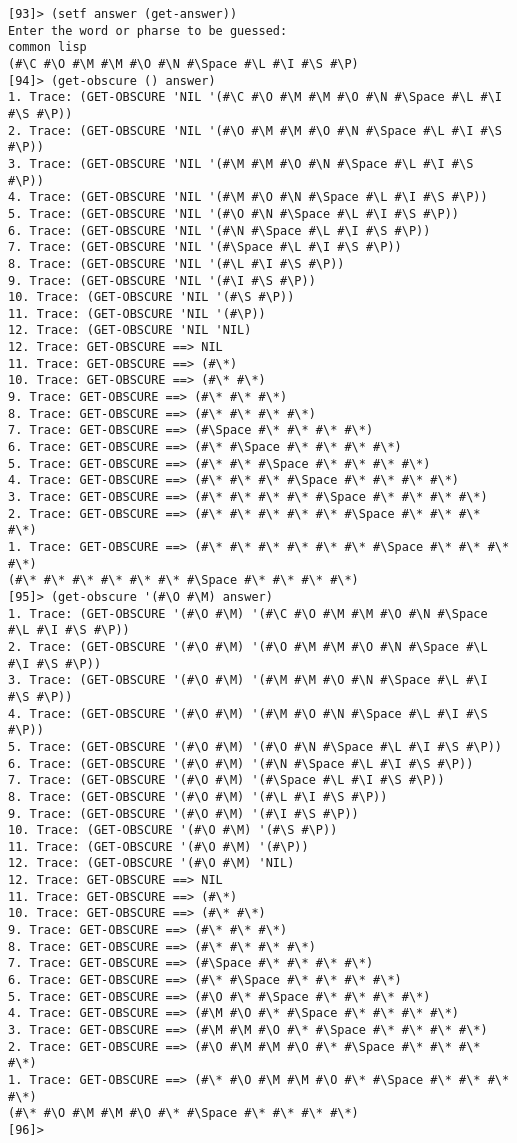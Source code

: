 \documentclass{article}
\begin{document}
\begin{verbatim}
[93]> (setf answer (get-answer))
Enter the word or pharse to be guessed:
common lisp
(#\C #\O #\M #\M #\O #\N #\Space #\L #\I #\S #\P)
[94]> (get-obscure () answer)
1. Trace: (GET-OBSCURE 'NIL '(#\C #\O #\M #\M #\O #\N #\Space #\L #\I #\S #\P))
2. Trace: (GET-OBSCURE 'NIL '(#\O #\M #\M #\O #\N #\Space #\L #\I #\S #\P))
3. Trace: (GET-OBSCURE 'NIL '(#\M #\M #\O #\N #\Space #\L #\I #\S #\P))
4. Trace: (GET-OBSCURE 'NIL '(#\M #\O #\N #\Space #\L #\I #\S #\P))
5. Trace: (GET-OBSCURE 'NIL '(#\O #\N #\Space #\L #\I #\S #\P))
6. Trace: (GET-OBSCURE 'NIL '(#\N #\Space #\L #\I #\S #\P))
7. Trace: (GET-OBSCURE 'NIL '(#\Space #\L #\I #\S #\P))
8. Trace: (GET-OBSCURE 'NIL '(#\L #\I #\S #\P))
9. Trace: (GET-OBSCURE 'NIL '(#\I #\S #\P))
10. Trace: (GET-OBSCURE 'NIL '(#\S #\P))
11. Trace: (GET-OBSCURE 'NIL '(#\P))
12. Trace: (GET-OBSCURE 'NIL 'NIL)
12. Trace: GET-OBSCURE ==> NIL
11. Trace: GET-OBSCURE ==> (#\*)
10. Trace: GET-OBSCURE ==> (#\* #\*)
9. Trace: GET-OBSCURE ==> (#\* #\* #\*)
8. Trace: GET-OBSCURE ==> (#\* #\* #\* #\*)
7. Trace: GET-OBSCURE ==> (#\Space #\* #\* #\* #\*)
6. Trace: GET-OBSCURE ==> (#\* #\Space #\* #\* #\* #\*)
5. Trace: GET-OBSCURE ==> (#\* #\* #\Space #\* #\* #\* #\*)
4. Trace: GET-OBSCURE ==> (#\* #\* #\* #\Space #\* #\* #\* #\*)
3. Trace: GET-OBSCURE ==> (#\* #\* #\* #\* #\Space #\* #\* #\* #\*)
2. Trace: GET-OBSCURE ==> (#\* #\* #\* #\* #\* #\Space #\* #\* #\* #\*)
1. Trace: GET-OBSCURE ==> (#\* #\* #\* #\* #\* #\* #\Space #\* #\* #\* #\*)
(#\* #\* #\* #\* #\* #\* #\Space #\* #\* #\* #\*)
[95]> (get-obscure '(#\O #\M) answer)
1. Trace: (GET-OBSCURE '(#\O #\M) '(#\C #\O #\M #\M #\O #\N #\Space #\L #\I #\S #\P))
2. Trace: (GET-OBSCURE '(#\O #\M) '(#\O #\M #\M #\O #\N #\Space #\L #\I #\S #\P))
3. Trace: (GET-OBSCURE '(#\O #\M) '(#\M #\M #\O #\N #\Space #\L #\I #\S #\P))
4. Trace: (GET-OBSCURE '(#\O #\M) '(#\M #\O #\N #\Space #\L #\I #\S #\P))
5. Trace: (GET-OBSCURE '(#\O #\M) '(#\O #\N #\Space #\L #\I #\S #\P))
6. Trace: (GET-OBSCURE '(#\O #\M) '(#\N #\Space #\L #\I #\S #\P))
7. Trace: (GET-OBSCURE '(#\O #\M) '(#\Space #\L #\I #\S #\P))
8. Trace: (GET-OBSCURE '(#\O #\M) '(#\L #\I #\S #\P))
9. Trace: (GET-OBSCURE '(#\O #\M) '(#\I #\S #\P))
10. Trace: (GET-OBSCURE '(#\O #\M) '(#\S #\P))
11. Trace: (GET-OBSCURE '(#\O #\M) '(#\P))
12. Trace: (GET-OBSCURE '(#\O #\M) 'NIL)
12. Trace: GET-OBSCURE ==> NIL
11. Trace: GET-OBSCURE ==> (#\*)
10. Trace: GET-OBSCURE ==> (#\* #\*)
9. Trace: GET-OBSCURE ==> (#\* #\* #\*)
8. Trace: GET-OBSCURE ==> (#\* #\* #\* #\*)
7. Trace: GET-OBSCURE ==> (#\Space #\* #\* #\* #\*)
6. Trace: GET-OBSCURE ==> (#\* #\Space #\* #\* #\* #\*)
5. Trace: GET-OBSCURE ==> (#\O #\* #\Space #\* #\* #\* #\*)
4. Trace: GET-OBSCURE ==> (#\M #\O #\* #\Space #\* #\* #\* #\*)
3. Trace: GET-OBSCURE ==> (#\M #\M #\O #\* #\Space #\* #\* #\* #\*)
2. Trace: GET-OBSCURE ==> (#\O #\M #\M #\O #\* #\Space #\* #\* #\* #\*)
1. Trace: GET-OBSCURE ==> (#\* #\O #\M #\M #\O #\* #\Space #\* #\* #\* #\*)
(#\* #\O #\M #\M #\O #\* #\Space #\* #\* #\* #\*)
[96]>
\end{verbatim}
\end{document}
